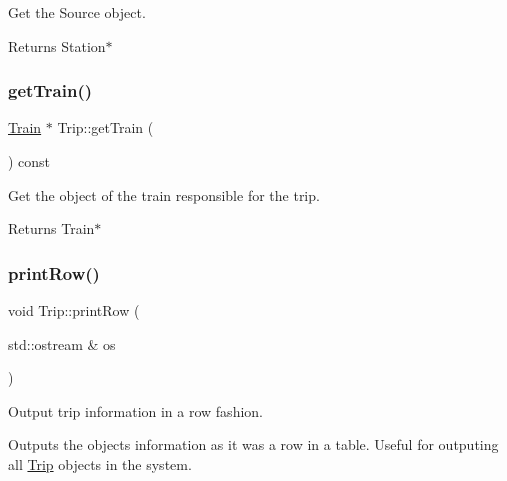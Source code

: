 Get the Source object. 

\begin{DoxyReturn}{Returns}
Station$\ast$ 
\end{DoxyReturn}
\mbox{\label{classTrip_a7595a39e9aa91e321d37b1696da50024}} 
\subsubsection{\texorpdfstring{get\+Train()}{getTrain()}}
{\footnotesize\ttfamily \mbox{\hyperlink{classTrain}{Train}} $\ast$ Trip\+::get\+Train (\begin{DoxyParamCaption}{ }\end{DoxyParamCaption}) const}



Get the object of the train responsible for the trip. 

\begin{DoxyReturn}{Returns}
Train$\ast$ 
\end{DoxyReturn}
\mbox{\label{classTrip_a233bab5c803f51ee5e79c611a15699c0}} 
\subsubsection{\texorpdfstring{print\+Row()}{printRow()}}
{\footnotesize\ttfamily void Trip\+::print\+Row (\begin{DoxyParamCaption}\item[{std\+::ostream \&}]{os }\end{DoxyParamCaption})}



Output trip information in a row fashion. 

Outputs the object\textquotesingle{}s information as it was a row in a table. Useful for outputing all \mbox{\hyperlink{classTrip}{Trip}} objects in the system.


